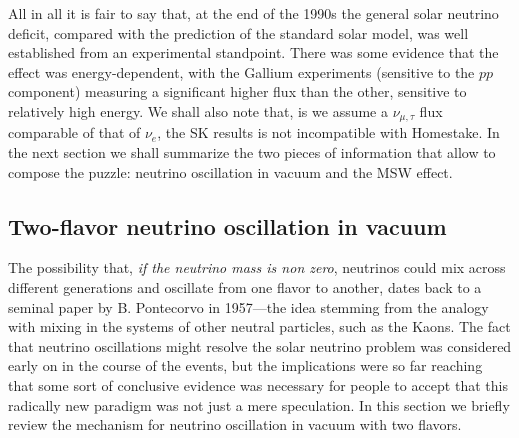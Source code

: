 All in all it is fair to say that, at the end of the 1990s the general solar neutrino
deficit, compared with the prediction of the standard solar model, was well established
from an experimental standpoint. There was some evidence that the effect was
energy-dependent, with the Gallium experiments (sensitive to the $pp$ component)
measuring a significant higher flux than the other, sensitive to relatively high
energy. We shall also note that, is we assume a $\nu_{\mu,\tau}$ flux comparable
of that of $\nu_e$, the SK results is not incompatible with Homestake. In the next
section we shall summarize the two pieces of information that allow to compose the
puzzle: neutrino oscillation in vacuum and the MSW effect.




\subsection{Two-flavor neutrino oscillation in vacuum}

The possibility that, \emph{if the neutrino mass is non zero}, neutrinos could mix
across different generations and oscillate from one flavor to another, dates back to a
seminal paper by B. Pontecorvo in 1957---the idea stemming from the analogy with
mixing in the systems of other neutral particles, such as the Kaons. The fact that
neutrino oscillations might resolve the solar neutrino problem was considered early
on in the course of the events, but the implications were so far reaching that some
sort of conclusive evidence was necessary for people to accept that this radically
new paradigm was not just a mere speculation. In this section we briefly review the
mechanism for neutrino oscillation in vacuum with two flavors.

